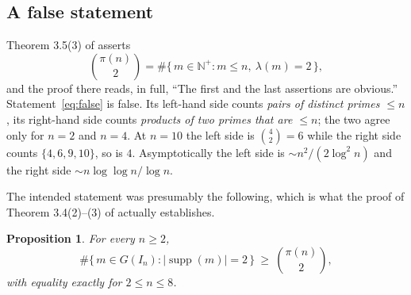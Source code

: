 \documentclass[a4paper,11pt,oneside,reqno]{amsart}
\theoremstyle{definition}
\theoremstyle{remark}
\theoremstyle{plain}
\newtheorem{proposition}[definition]{Proposition}
\newcommand{\NN}{\mathbb{N}}
\begin{document}
\subsection{A false statement}

Theorem 3.5(3) of \cite{Snellman2000} asserts
\begin{equation}\label{eq:false}
  \binom{\pi(n)}{2} = \#\{\,m \in \NN^+ : m \le n,\ \lambda(m) = 2\,\},
\end{equation}
and the proof there reads, in full, ``The first and the last assertions are
obvious.'' Statement~\eqref{eq:false} is false. Its left-hand side counts
\emph{pairs of distinct primes \(\le n\)}, its right-hand side counts
\emph{products of two primes that are \(\le n\)}; the two agree only for
\(n = 2\) and \(n = 4\). At \(n = 10\) the left side is \(\binom{4}{2} = 6\) while the
right side counts \(\{4,6,9,10\}\), so is \(4\). Asymptotically the left side is
\(\sim n^{2}/(2\log^{2}n)\) and the right side \(\sim n\log\log n/\log n\).

The intended statement was presumably the following, which is what the proof of
Theorem 3.4(2)--(3) of \cite{Snellman2000} actually establishes.

\begin{proposition}\label{prop:fixed35}
  For every \(n \ge 2\),
  \begin{equation}\label{eq:supp2}
    \#\{\,m \in G(I_n) : |\!\operatorname{supp}(m)|=2\,\}
      \ \ge \ \binom{\pi(n)}{2},
  \end{equation}
  with equality exactly for \(2 \le n \le 8\).
\end{proposition}
\end{document}

